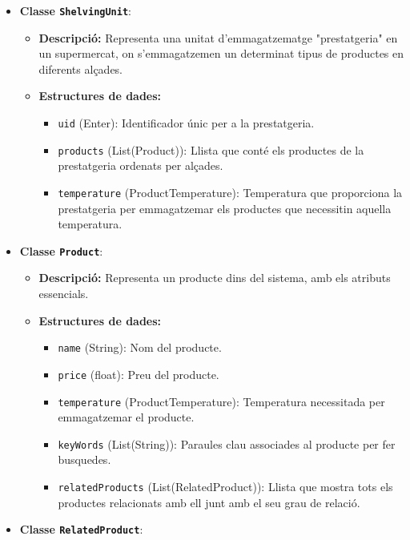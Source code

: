 \documentclass[a4paper,12pt]{report}
\begin{document}
\begin{itemize}
	\item \textbf{Classe \texttt{ShelvingUnit}}:
	      \begin{itemize}
		      \item \textbf{Descripció:} Representa una unitat d'emmagatzematge "prestatgeria" en un supermercat, on s'emmagatzemen un determinat tipus de productes en diferents alçades.
		      \item \textbf{Estructures de dades:}
		            \begin{itemize}
			            \item \texttt{uid} (Enter): Identificador únic per a la prestatgeria.
			            \item \texttt{products} (List(Product)): Llista que conté els productes de la prestatgeria ordenats per alçades.
			            \item \texttt{temperature} (ProductTemperature): Temperatura que proporciona la prestatgeria per emmagatzemar els productes que necessitin aquella temperatura.
		            \end{itemize}
	      \end{itemize}
	\item \textbf{Classe \texttt{Product}}:
	      \begin{itemize}
		      \item \textbf{Descripció:} Representa un producte dins del sistema, amb els atributs essencials.
		      \item \textbf{Estructures de dades:}
		            \begin{itemize}
			            \item \texttt{name} (String): Nom del producte.
			            \item \texttt{price} (float): Preu del producte.
			            \item \texttt{temperature} (ProductTemperature): Temperatura necessitada per emmagatzemar el producte.
			            \item \texttt{keyWords} (List(String)): Paraules clau associades al producte per fer busquedes.
			            \item \texttt{relatedProducts} (List(RelatedProduct)): Llista que mostra tots els productes relacionats amb ell junt amb el seu grau de relació.
		            \end{itemize}
	      \end{itemize}
	\item \textbf{Classe \texttt{RelatedProduct}}:
	      \begin{itemize}

\end{itemize}
\end{itemize}
\end{document}
